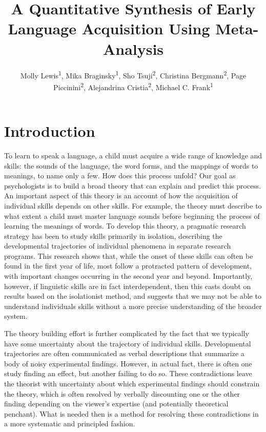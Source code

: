 \documentclass[english,floatsintext,man]{apa6}
\title{A Quantitative Synthesis of Early Language Acquisition Using
Meta-Analysis}
\author{
          Molly Lewis\textsuperscript{1},
          Mika Braginsky\textsuperscript{1},
          Sho Tsuji\textsuperscript{2},
          Christina Bergmann\textsuperscript{2},
          Page Piccinini\textsuperscript{2},
          Alejandrina Cristia\textsuperscript{2},
          Michael C. Frank\textsuperscript{1}  }
\affiliation{
    \vspace{0.5cm}
          \textsuperscript{1} Department of Psychology, Stanford University\\
          \textsuperscript{2} Laboratoire de Sciences Cognitives et Psycholinguistique, ENS  }
\begin{document}
\maketitle



\section{Introduction}\label{introduction}

To learn to speak a language, a child must acquire a wide range of
knowledge and skills: the sounds of the language, the word forms, and
the mappings of words to meanings, to name only a few. How does this
process unfold? Our goal as psychologists is to build a broad theory
that can explain and predict this process. An important aspect of this
theory is an account of how the acquisition of individual skills depends
on other skills. For example, the theory must describe to what extent a
child must master language sounds before beginning the process of
learning the meanings of words. To develop this theory, a pragmatic
research strategy has been to study skills primarily in isolation,
describing the developmental trajectories of individual phenomena in
separate research programs. This research shows that, while the onset of
these skills can often be found in the first year of life, most follow a
protracted pattern of development, with important changes occurring in
the second year and beyond. Importantly, however, if linguistic skills
are in fact interdependent, then this casts doubt on results based on
the isolationist method, and suggests that we may not be able to
understand individuals skills without a more precise understanding of
the broader system.

The theory building effort is further complicated by the fact that we
typically have some uncertainty about the trajectory of individual
skills. Developmental trajectories are often communicated as verbal
descriptions that summarize a body of noisy experimental findings.
However, in actual fact, there is often one study finding an effect, but
another failing to do so. These contradictions leave the theorist with
uncertainty about which experimental findings should constrain the
theory, which is often resolved by verbally discounting one or the other
finding depending on the viewer's expertise (and potentially theoretical
penchant). What is needed then is a method for resolving these
contradictions in a more systematic and principled fashion.
\end{document}
